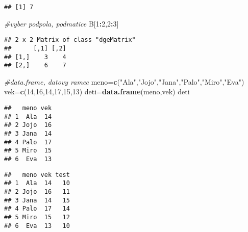 \documentclass[
]{article}
\newenvironment{Shaded}{\begin{snugshade}}{\end{snugshade}}
\newcommand{\CommentTok}[1]{\textcolor[rgb]{0.56,0.35,0.01}{\textit{#1}}}
\newcommand{\DecValTok}[1]{\textcolor[rgb]{0.00,0.00,0.81}{#1}}
\newcommand{\FunctionTok}[1]{\textcolor[rgb]{0.13,0.29,0.53}{\textbf{#1}}}
\newcommand{\NormalTok}[1]{#1}
\newcommand{\OtherTok}[1]{\textcolor[rgb]{0.56,0.35,0.01}{#1}}
\newcommand{\SpecialCharTok}[1]{\textcolor[rgb]{0.81,0.36,0.00}{\textbf{#1}}}
\newcommand{\StringTok}[1]{\textcolor[rgb]{0.31,0.60,0.02}{#1}}
\begin{document}
\begin{verbatim}
## [1] 7
\end{verbatim}

\begin{Shaded}
\begin{Highlighting}[]
\CommentTok{\#vyber podpola, podmatice}
\NormalTok{B[}\DecValTok{1}\SpecialCharTok{:}\DecValTok{2}\NormalTok{,}\DecValTok{2}\SpecialCharTok{:}\DecValTok{3}\NormalTok{]}
\end{Highlighting}
\end{Shaded}

\begin{verbatim}
## 2 x 2 Matrix of class "dgeMatrix"
##      [,1] [,2]
## [1,]    3    4
## [2,]    6    7
\end{verbatim}

\begin{Shaded}
\begin{Highlighting}[]
\CommentTok{\#data.frame, datovy ramec}
\NormalTok{meno}\OtherTok{=}\FunctionTok{c}\NormalTok{(}\StringTok{"Ala"}\NormalTok{,}\StringTok{"Jojo"}\NormalTok{,}\StringTok{"Jana"}\NormalTok{,}\StringTok{"Palo"}\NormalTok{,}\StringTok{"Miro"}\NormalTok{,}\StringTok{"Eva"}\NormalTok{)}
\NormalTok{vek}\OtherTok{=}\FunctionTok{c}\NormalTok{(}\DecValTok{14}\NormalTok{,}\DecValTok{16}\NormalTok{,}\DecValTok{14}\NormalTok{,}\DecValTok{17}\NormalTok{,}\DecValTok{15}\NormalTok{,}\DecValTok{13}\NormalTok{)}
\NormalTok{deti}\OtherTok{=}\FunctionTok{data.frame}\NormalTok{(meno,vek)}
\NormalTok{deti}
\end{Highlighting}
\end{Shaded}

\begin{verbatim}
##   meno vek
## 1  Ala  14
## 2 Jojo  16
## 3 Jana  14
## 4 Palo  17
## 5 Miro  15
## 6  Eva  13
\end{verbatim}

\begin{Shaded}
\end{Shaded}

\begin{verbatim}
##   meno vek test
## 1  Ala  14   10
## 2 Jojo  16   11
## 3 Jana  14   15
## 4 Palo  17   14
## 5 Miro  15   12
## 6  Eva  13   10
\end{verbatim}
\end{document}
